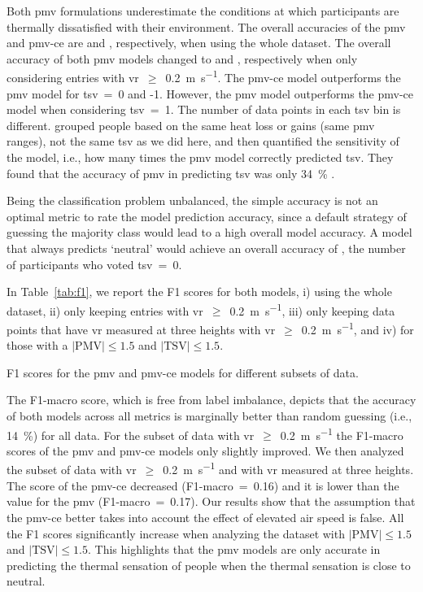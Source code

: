 Both \ac{pmv} formulations underestimate the conditions at which participants are thermally dissatisfied with their environment.
The overall accuracies of the \ac{pmv} and \ac{pmv-ce} are  and , respectively, when using the whole dataset.
The overall accuracy of both \ac{pmv} models changed to  and , respectively when only considering entries with \ac{vr}~$\geq$~\qty{0.2}{\m\per\s}.
The \ac{pmv-ce} model outperforms the \ac{pmv} model for \ac{tsv}~=~0 and -1.
However, the \ac{pmv} model outperforms the \ac{pmv-ce} model when considering \ac{tsv}~=~1.
The number of data points in each \ac{tsv} bin is different.
 grouped people based on the same heat loss or gains (same \ac{pmv} ranges), not the same \ac{tsv} as we did here, and then quantified the sensitivity of the model, i.e., how many times the \ac{pmv} model correctly predicted \ac{tsv}.
They found that the accuracy of \ac{pmv} in predicting \ac{tsv} was only \qty{34}{\percent} .

Being the classification problem unbalanced, the simple accuracy is not an optimal metric to rate the model prediction accuracy, since a default strategy of guessing the majority class would lead to a high overall model accuracy.
A model that always predicts `neutral' would achieve an overall accuracy of , the number of participants who voted \ac{tsv}~=~0.

In Table~\ref{tab:f1}, we report the F1 scores for both models, i) using the whole dataset, ii) only keeping entries with \ac{vr}~$\geq$~\qty{0.2}{\m\per\s}, iii) only keeping data points that have \ac{vr} measured at three heights with \ac{vr}~$\geq$~\qty{0.2}{\m\per\s}, and iv) for those with a $\lvert \textrm{PMV}\lvert \leq 1.5$ and $\lvert \textrm{TSV}\lvert \leq 1.5$.
\begin{table}[htb!]
    \centering
    
    \caption{F1 scores for the \ac{pmv} and \ac{pmv-ce} models for different subsets of data.}
    \label{tab:f1}
\end{table}
The F1-macro score, which is free from label imbalance, depicts that the accuracy of both models across all metrics is marginally better than random guessing (i.e., \qty{14}{\percent}) for all data.
For the subset of data with \ac{vr}~$\geq$~\qty{0.2}{\m\per\s} the F1-macro scores of the \ac{pmv} and \ac{pmv-ce} models only slightly improved.
We then analyzed the subset of data with \ac{vr}~$\geq$~\qty{0.2}{\m\per\s} and with \ac{vr} measured at three heights.
The score of the \ac{pmv-ce} decreased (F1-macro~=~\num{0.16}) and it is lower than the value for the \ac{pmv} (F1-macro~=~\num{0.17}).
Our results show that the assumption that the \ac{pmv-ce} better takes into account the effect of elevated air speed is false.
All the F1 scores significantly increase when analyzing the dataset with $\lvert \textrm{PMV}\lvert \leq 1.5$ and $\lvert \textrm{TSV}\lvert \leq 1.5$.
This highlights that the \ac{pmv} models are only accurate in predicting the thermal sensation of people when the thermal sensation is close to neutral.

